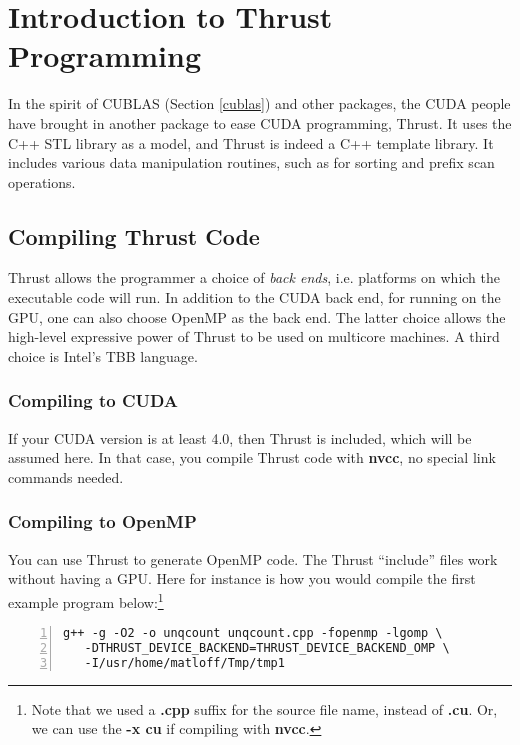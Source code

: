 \chapter{Introduction to Thrust Programming} 
\label{chap:thrust} 

In the spirit of CUBLAS (Section \ref{cublas}) and other packages, the
CUDA people have brought in another package to ease CUDA programming,
Thrust.  It uses the C++ STL library as a model, and Thrust is indeed a
C++ template library.  It includes various data manipulation routines,
such as for sorting and prefix scan operations.

\section{Compiling Thrust Code}

Thrust allows the programmer a choice of {\it back ends}, i.e. platforms
on which the executable code will run.  In addition to the CUDA back
end, for running on the GPU, one can also choose OpenMP as the back end.
The latter choice allows the high-level expressive power of Thrust to be
used on multicore machines.  A third choice is Intel's TBB language.

\subsection{Compiling to CUDA}

If your CUDA version is at least 4.0, then Thrust is included, which
will be assumed here.  In that case, you compile Thrust code with {\bf
nvcc}, no special link commands needed.

\subsection{Compiling to OpenMP}

You can use Thrust to generate OpenMP code.  The Thrust ``include''
files work without having a GPU.  Here for instance is how you would
compile the first example program below:\footnote{Note that we used a
{\bf .cpp} suffix for the source file name, instead of {\bf .cu}.  Or,
we can use the {\bf -x cu} if compiling with {\bf nvcc}.}

\begin{lstlisting}[numbers=left]
g++ -g -O2 -o unqcount unqcount.cpp -fopenmp -lgomp \
   -DTHRUST_DEVICE_BACKEND=THRUST_DEVICE_BACKEND_OMP \
   -I/usr/home/matloff/Tmp/tmp1
\end{lstlisting}

